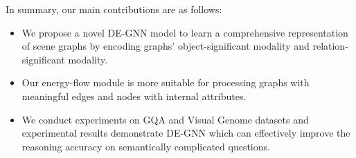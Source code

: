 \documentclass[letterpaper]{article} %
\begin{document}
In summary, our main contributions are as follows:%
\begin{itemize}
\setlength{\itemsep}{5pt}
\setlength{\parsep}{5pt}
\setlength{\parskip}{5pt}
\item We propose a novel DE-GNN model to learn a comprehensive representation of scene graphs by encoding graphs' object-significant modality and relation-significant modality.\vspace{-0.06in}

\item Our energy-flow module is more suitable for processing graphs with meaningful edges and nodes with internal attributes.\vspace{-0.06in}

\item We conduct experiments on GQA and Visual Genome datasets and experimental results demonstrate DE-GNN which can effectively improve the reasoning accuracy on semantically complicated questions.
\end{itemize}\vspace{-0.06in}
\end{document}
